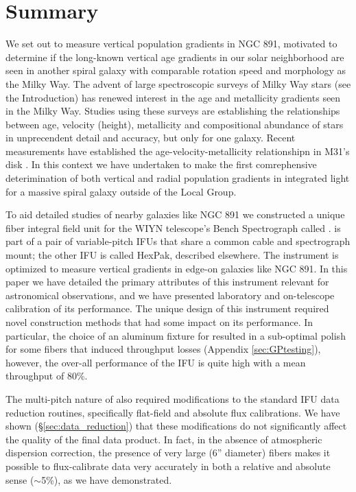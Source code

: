 \section{Summary}
\label{sec:summary}

We set out to measure vertical population gradients in NGC 891,
motivated to determine if the long-known vertical age gradients in our
solar neighborhood are seen in another spiral galaxy with comparable
rotation speed and morphology as the Milky Way.  The advent of large
spectroscopic surveys of Milky Way stars (see the Introduction) has
renewed interest in the age and metallicity gradients seen in the
Milky Way. Studies using these surveys
\citep[e.g.,][]{Bovy12c,Hayden14,Hayden15} are establishing the
relationships between age, velocity (height), metallicity and
compositional abundance of stars in unprecendent detail and accuracy,
but only for one galaxy.  Recent measurements have established the
age-velocity-metallicity relationshipn in M31's disk
\citep{Dorman15}. In this context we have undertaken to make the first
comrephensive deterimination of both vertical and radial population
gradients in integrated light for a massive spiral galaxy outside of
the Local Group.

To aid detailed studies of nearby galaxies like NGC 891 we constructed
a unique fiber integral field unit for the WIYN telescope's Bench
Spectrograph called \GP. \GP is part of a pair of variable-pitch IFUs
that share a common cable and spectrograph mount; the other IFU is
called HexPak, described elsewhere.  The \GP instrument is optimized
to measure vertical gradients in edge-on galaxies like NGC 891. In
this paper we have detailed the primary attributes of this instrument
relevant for astronomical observations, and we have presented
laboratory and on-telescope calibration of its performance.  The
unique design of this instrument required novel construction methods
that had some impact on its performance. In particular, the choice of
an aluminum fixture for \GP resulted in a sub-optimal polish for some
fibers that induced throughput losses (Appendix \ref{sec:GPtesting}),
however, the over-all performance of the IFU is quite high with a mean
throughput of 80\%.

The multi-pitch nature of \GP also required modifications to the
standard IFU data reduction routines, specifically flat-field and
absolute flux calibrations. We have shown (\S\ref{sec:data_reduction})
that these modifications do not significantly affect the quality of
the final data product. In fact, in the absence of atmospheric
dispersion correction, the presence of very large (6'' diameter)
fibers makes it possible to flux-calibrate \GP data very accurately in
both a relative and absolute sense ($\sim$5\%), as we have
demonstrated.

